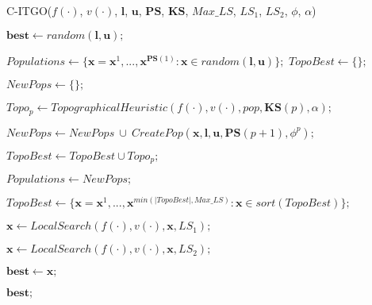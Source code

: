 \begin{breakablealgorithm}
\caption{C-ITGO($f(\cdot)$, $v(\cdot)$, $\bm{l}$, $\bm{u}$, $\bm{PS}$, $\bm{KS}$, $Max\_LS$, $LS_1$, $LS_2$, $\phi$, $\alpha$)}
\label{alg:ITGO}
\begin{spacing}{1.5}
\begin{algorithmic}[1]

\Statex
\State $\bm{best} \gets random(\bm{l}, \bm{u});$



\State $Populations \gets \{\bm{x} = \bm{x}^1, ..., \bm{x}^{\bm{PS}(1)} : \bm{x} \in random(\bm{l}, \bm{u}) \};$
\State $TopoBest \gets \{\};$


\State $NewPops \gets \{\};$


\State $Topo_p \gets TopographicalHeuristic(f(\cdot), v(\cdot), pop, \bm{KS}(p), \alpha);$



\State $NewPops \gets NewPops \ \cup \ CreatePop(\bm{x}, \bm{l}, \bm{u},\bm{PS}(p+1), \phi^p);$
\EndFor

\Else
\State $TopoBest \gets TopoBest \cup Topo_p;$
\EndIf
\EndFor

\State $Populations \gets NewPops;$
\EndIf
\EndFor

\State $TopoBest \gets \{\bm{x} = \bm{x}^1, ..., \bm{x}^{min(|TopoBest|, Max\_LS)} : \bm{x} \in sort(TopoBest)\};$


\State $\bm{x} \gets LocalSearch(f(\cdot), v(\cdot), \bm{x}, LS_1);$



\State $\bm{x} \gets LocalSearch(f(\cdot), v(\cdot), \bm{x}, LS_2);$


\State $\bm{best} \gets \bm{x};$
\EndIf
\EndIf

\EndFor

\EndWhile

\State \Return $\bm{best};$


\end{algorithmic}
\end{spacing}
\end{breakablealgorithm}